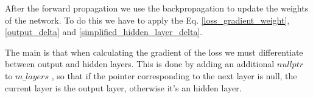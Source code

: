 \documentclass[12pt]{article}
\begin{document}


\noindent After the forward propagation we use the backpropagation to update the weights of the network. To 
do this we have to apply the Eq. \ref{loss_gradient_weight}, \ref{output_delta} and 
\ref{simplified_hidden_layer_delta}.


\noindent The main is that when calculating the gradient of the loss we must differentiate between output 
and hidden 
layers. This is done by adding an additional $nullptr$ to $m\_layers$ , so that if the pointer corresponding
to the next layer is null, the current layer is the output layer, otherwise it's an hidden layer.
\end{document}
